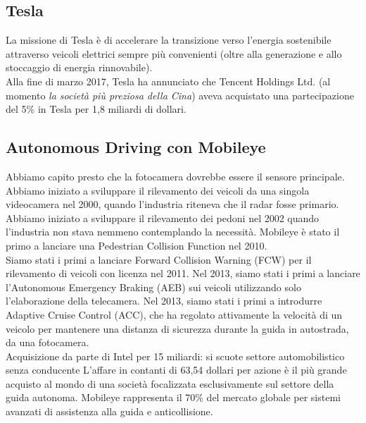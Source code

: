 \documentclass[a4paper,portrait,12pt]{article}
\theoremstyle{definition}
\begin{document}
\subsection{Tesla}
La missione di Tesla è di accelerare la transizione verso l'energia sostenibile attraverso veicoli elettrici sempre più convenienti (oltre alla generazione e allo stoccaggio di energia rinnovabile).\\


Alla fine di marzo 2017, Tesla ha annunciato che Tencent Holdings Ltd. (al momento \emph{la società più preziosa della Cina}) aveva acquistato una partecipazione del 5\% in Tesla per 1,8 miliardi di dollari.


\subsection{Autonomous Driving con Mobileye}
Abbiamo capito presto che la fotocamera dovrebbe essere il sensore principale.
Abbiamo iniziato a sviluppare il rilevamento dei veicoli da una singola videocamera nel 2000, quando l'industria riteneva che il radar fosse primario.
Abbiamo iniziato a sviluppare il rilevamento dei pedoni nel 2002 quando l'industria non stava nemmeno contemplando la necessità.
Mobileye è stato il primo a lanciare una Pedestrian Collision Function nel 2010.\\

Siamo stati i primi a lanciare Forward Collision Warning (FCW) per il rilevamento di veicoli con licenza nel 2011.
Nel 2013, siamo stati i primi a lanciare l'Autonomous Emergency Braking (AEB) sui veicoli utilizzando solo l'elaborazione della telecamera.
Nel 2013, siamo stati i primi a introdurre Adaptive Cruise Control (ACC), che ha regolato attivamente la velocità di un veicolo per mantenere una distanza di sicurezza durante la guida in autostrada, da una fotocamera.\\

Acquisizione da parte di Intel per 15 miliardi: si scuote settore automobilistico senza conducente
L'affare in contanti di 63,54 dollari per azione è il più grande acquisto al mondo di una società focalizzata esclusivamente sul settore della guida autonoma.
Mobileye rappresenta il 70\% del mercato globale per sistemi avanzati di assistenza alla guida e anticollisione.
\end{document}

